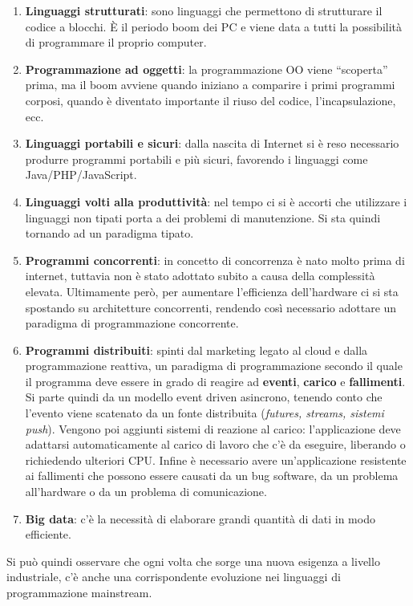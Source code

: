 \begin{enumerate}
	\item \textbf{Linguaggi strutturati}: sono linguaggi che permettono di strutturare il codice a blocchi. \`E il periodo boom dei PC e viene data a tutti la possibilità di programmare il proprio computer.
	\item \textbf{Programmazione ad oggetti}: la programmazione OO viene ``scoperta'' prima, ma il boom avviene quando iniziano a comparire i primi programmi corposi, quando è diventato importante il riuso del codice, l'incapsulazione, ecc.
	\item \textbf{Linguaggi portabili e sicuri}: dalla nascita di Internet si è reso necessario produrre programmi portabili e più sicuri, favorendo i linguaggi come Java/PHP/JavaScript.
	\item \textbf{Linguaggi volti alla produttività}: nel tempo ci si è accorti che utilizzare i linguaggi non tipati porta a dei problemi di manutenzione. Si sta quindi tornando ad un paradigma tipato.
	\item \textbf{Programmi concorrenti}: in concetto di concorrenza è nato molto prima di internet, tuttavia non è stato adottato subito a causa della complessità elevata. Ultimamente però, per aumentare l'efficienza dell'hardware ci si sta spostando su architetture concorrenti, rendendo così necessario adottare un paradigma di programmazione concorrente.
	\item \textbf{Programmi distribuiti}: spinti dal marketing legato al cloud e dalla programmazione reattiva, un paradigma di programmazione secondo il quale il programma deve essere in grado di reagire ad \textbf{eventi}, \textbf{carico} e \textbf{fallimenti}. Si parte quindi da un modello event driven asincrono, tenendo conto che l'evento viene scatenato da un fonte distribuita (\textit{futures, streams, sistemi push}). Vengono poi aggiunti sistemi di reazione al carico: l'applicazione deve adattarsi automaticamente al carico di lavoro che c'è da eseguire, liberando o richiedendo ulteriori CPU. Infine è necessario avere un'applicazione resistente ai fallimenti che possono essere causati da un bug software, da un problema all'hardware o da un problema di comunicazione.
	\item \textbf{Big data}: c'è la necessità di elaborare grandi quantità di dati in modo efficiente.
\end{enumerate}

\noindent Si può quindi osservare che ogni volta che sorge una nuova esigenza a livello industriale, c'è anche una corrispondente evoluzione nei linguaggi di programmazione mainstream.


